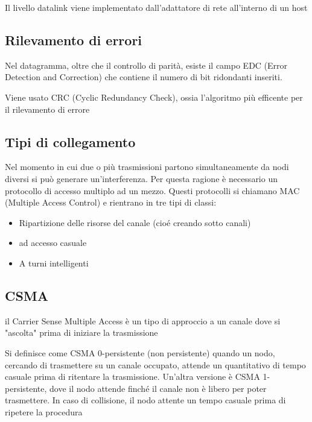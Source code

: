 \documentclass[12pt, a4paper]{article}
\begin{document}
Il livello datalink viene implementato dall'adattatore di rete all'interno di un host

\subsection{Rilevamento di errori}
Nel datagramma, oltre che il controllo di parità, esiste il campo EDC (Error Detection and Correction) 
che contiene il numero di bit ridondanti inseriti. 

Viene usato CRC (Cyclic Redundancy Check), ossia l'algoritmo più efficente per il rilevamento di errore



\subsection{Tipi di collegamento}
Nel momento in cui due o più trasmissioni partono simultaneamente da nodi diversi si può generare un'interferenza.
Per questa ragione è necessario un protocollo di accesso multiplo ad un mezzo. Questi protocolli si chiamano MAC
(Multiple Access Control) e rientrano in tre tipi di classi:
\begin{itemize}
    \item Ripartizione delle risorse del canale (cioé creando sotto canali)
    \item ad accesso casuale
    \item A turni intelligenti
\end{itemize}


\subsection{CSMA}
il Carrier Sense Multiple Access è un tipo di approccio a un canale dove si "ascolta" prima di iniziare la 
trasmissione

Si definisce come CSMA 0-persistente (non persistente) quando un nodo, cercando di trasmettere su un canale
occupato, attende un quantitativo di tempo casuale prima di ritentare la trasmissione. Un'altra versione è
CSMA 1-persistente, dove il nodo attende finché il canale non è libero per poter trasmettere. In caso di 
collisione, il nodo attente un tempo casuale prima di ripetere la procedura
\end{document}
